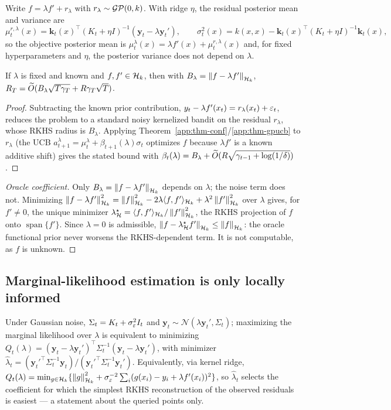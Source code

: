 Write $f=\lambda f'+r_\lambda$ with $r_\lambda\sim\mathcal{GP}(0,k)$. With ridge $\eta$,
the residual posterior mean and variance are
\[
\mu_t^{r,\lambda}(x)=\mathbf k_t(x)^\top(K_t+\eta I)^{-1}(\mathbf y_t-\lambda\mathbf y_t'),
\qquad
\sigma_t^2(x)=k(x,x)-\mathbf k_t(x)^\top(K_t+\eta I)^{-1}\mathbf k_t(x),
\]
so the objective posterior mean is $\mu_t^\lambda(x)=\lambda f'(x)+\mu_t^{r,\lambda}(x)$
and, for fixed hyperparameters and $\eta$, the posterior variance does not depend
on $\lambda$.

\begin{theorem}
\label{app:thm-priorfixed}
If $\lambda$ is fixed and known and $f,f'\in\mathcal{H}_k$, then with
$B_\lambda=\left\lVert f-\lambda f'\right\rVert_{\mathcal{H}_k}$,
$R_T=\widetilde O(B_\lambda\sqrt{T\gamma_T}+R\gamma_T\sqrt{T})$.
\end{theorem}
\begin{proof}
Subtracting the known prior contribution, $y_t-\lambda f'(x_t)=r_\lambda(x_t)+\varepsilon_t$,
reduces the problem to a standard noisy kernelized bandit on the residual
$r_\lambda$, whose RKHS radius is $B_\lambda$. Applying
Theorem~\ref{app:thm-conf}/\ref{app:thm-gpucb} to $r_\lambda$ (the UCB
$a_{t+1}^\lambda=\mu_t^\lambda+\beta_{t+1}(\lambda)\sigma_t$ optimizes $f$ because
$\lambda f'$ is a known additive shift) gives the stated bound with
$\beta_t(\lambda)=B_\lambda+\widetilde O(R\sqrt{\gamma_{t-1}+\log(1/\delta)})$.
\end{proof}

\begin{proof}[Oracle coefficient]
Only $B_\lambda=\left\lVert f-\lambda f'\right\rVert_{\mathcal{H}_k}$ depends on $\lambda$; the noise term
does not. Minimizing $\left\lVert f-\lambda f'\right\rVert_{\mathcal{H}_k}^2=\left\lVert f\right\rVert_{\mathcal{H}_k}^2-2\lambda\langle f, f'\rangle_{\mathcal{H}_k}
+\lambda^2\left\lVert f'\right\rVert_{\mathcal{H}_k}^2$ over $\lambda$ gives, for $f'\neq0$, the unique
minimizer $\lambda^\star_{\mathcal{H}}=\langle f, f'\rangle_{\mathcal{H}_k}/\left\lVert f'\right\rVert_{\mathcal{H}_k}^2$, the RKHS
projection of $f$ onto $\operatorname{span}\{f'\}$. Since $\lambda=0$ is
admissible, $\left\lVert f-\lambda^\star_{\mathcal{H}}f'\right\rVert_{\mathcal{H}_k}\le\left\lVert f\right\rVert_{\mathcal{H}_k}$: the oracle
functional prior never worsens the RKHS-dependent term. It is not computable, as
$f$ is unknown.
\end{proof}

\subsection{Marginal-likelihood estimation is only locally informed}

Under Gaussian noise, $\Sigma_t=K_t+\sigma_\varepsilon^2 I_t$ and
$\mathbf y_t\sim\mathcal N(\lambda\mathbf y_t',\Sigma_t)$; maximizing the marginal
likelihood over $\lambda$ is equivalent to minimizing
$Q_t(\lambda)=(\mathbf y_t-\lambda\mathbf y_t')^\top\Sigma_t^{-1}(\mathbf y_t-\lambda\mathbf y_t')$,
with minimizer $\widehat\lambda_t=(\mathbf y_t'^\top\Sigma_t^{-1}\mathbf y_t)/
(\mathbf y_t'^\top\Sigma_t^{-1}\mathbf y_t')$. Equivalently, via kernel ridge,
$Q_t(\lambda)=\min_{g\in\mathcal{H}_k}\{\left\lVert g\right\rVert_{\mathcal{H}_k}^2+\sigma_\varepsilon^{-2}\sum_i(g(x_i)-y_i+\lambda f'(x_i))^2\}$,
so $\widehat\lambda_t$ selects the coefficient for which the simplest RKHS
reconstruction of the observed residuals is easiest --- a statement about the
queried points only.

